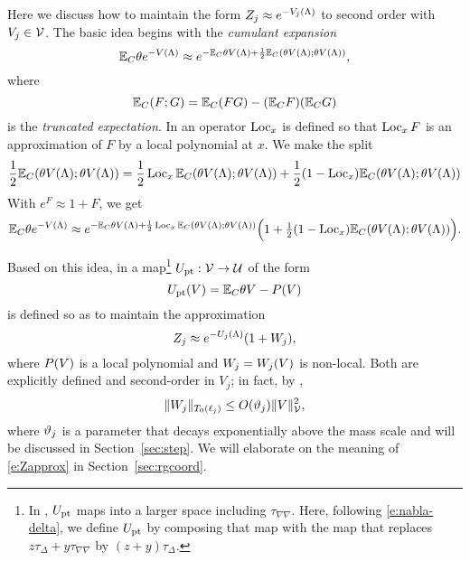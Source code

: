 Here we discuss how to maintain the form $Z_j \approx e^{-V_j(\Lambda)}$ to
second order with $V_j\in\mathcal{V}$. The basic idea begins with the \emph{cumulant
expansion}
\begin{equation}
\mathbb{E}_C \theta e^{-V(\Lambda)}
	\approx
e^{-\mathbb{E}_C \theta V(\Lambda) + \scriptstyle{\frac12} \mathbb{E}_C (\theta V(\Lambda); \theta V(\Lambda))},
\end{equation}
where
\begin{equation}
\mathbb{E}_C (F; G) = \mathbb{E}_C (FG) - (\mathbb{E}_C F) (\mathbb{E}_C G)
\end{equation}
is the \emph{truncated expectation}.
In \cite{BS-rg-loc} an operator $\operatorname{Loc}_x$ is defined so that $\operatorname{Loc}_x F$ is an
approximation of $F$ by a local polynomial at $x$. We make the split
\begin{equation}
\frac12 \mathbb{E}_C (\theta V(\Lambda); \theta V(\Lambda))
	=
\frac12 \operatorname{Loc}_x \mathbb{E}_C (\theta V(\Lambda); \theta V(\Lambda))
	+
\frac12 (1 - \operatorname{Loc}_x) \mathbb{E}_C (\theta V(\Lambda); \theta V(\Lambda))
\end{equation}
With
$e^F \approx 1 + F$, we get
\begin{equation}
\mathbb{E}_C \theta e^{-V(\Lambda)}
	\approx
e^{-\mathbb{E}_C \theta V(\Lambda)
	+
\scriptstyle{\frac12} \operatorname{Loc}_x \mathbb{E}_C (\theta V(\Lambda); \theta V(\Lambda))}
\Big(1 + \tfrac12 (1 - \operatorname{Loc}_x) \mathbb{E}_C (\theta V(\Lambda); \theta V(\Lambda))\Big).
\end{equation}

Based on this idea, in \cite{BBS-rg-pt}
a map\footnote{In \cite{BBS-rg-pt}, $U_{\rm pt}$ maps into a
larger space including $\tau_{\nabla\nabla}$. Here, following \eqref{e:nabla-delta},
we define $U_{\rm pt}$ by composing that map with the map that replaces
$z \tau_\Delta + y \tau_{\nabla\nabla}$ by $(z + y) \tau_\Delta$.}
$U_{\rm pt} : \mathcal{V}\rightarrow\mathcal{U}$ of the form
\begin{equation}
\label{e:Vpt-def}
U_{\rm pt}(V) = \mathbb{E}_C\theta V - P(V)
\end{equation}
is defined so as to maintain the approximation
\begin{equation}
\label{e:Zapprox}
Z_j \approx e^{-U_j(\Lambda)} (1 + W_j),
\end{equation}
where $P(V)$ is a local polynomial and $W_j = W_j(V)$ is non-local.
Both are explicitly defined and second-order in $V_j$;
in fact, by \cite[\eqref{IE-e:W-logwish}]{BS-rg-IE},
\begin{equation}
\label{e:Wbilinbd}
\|W_j\|_{T_0(\ell_j)}
	\le
O(\vartheta_j) \|V\|_{\mathcal{V}}^2,
\end{equation}
where $\vartheta_j$ is a parameter that decays exponentially above the mass scale
and will be discussed in Section~\ref{sec:step}. We will elaborate on the  meaning
of \eqref{e:Zapprox} in Section~\ref{sec:rgcoord}.

